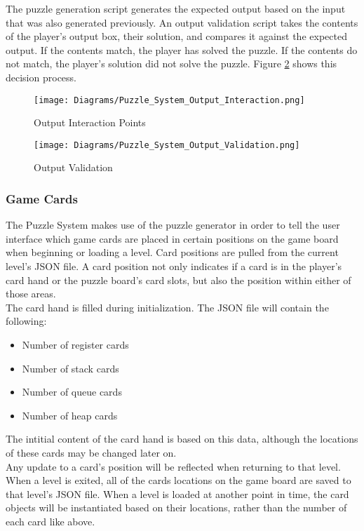 The puzzle generation script generates the expected output based on the input that
was also generated previously. An output validation script takes the contents of
the player's output box, their solution, and compares it against the expected output.
If the contents match, the player has solved the puzzle. If the contents do not match,
the player's solution did not solve the puzzle. Figure \ref{fig:Puzzle_System_Output_Validation} shows this decision process.

\begin{figure}[!hb]
  \caption{Output Interaction Points}
  \label{fig:Puzzle_System_Output_Interaction}
  \centering
  \texttt{[image: Diagrams/Puzzle\_System\_Output\_Interaction.png]}
\end{figure}

\begin{figure}[!hb]
  \caption{Output Validation}
  \label{fig:Puzzle_System_Output_Validation}
  \centering
  \texttt{[image: Diagrams/Puzzle\_System\_Output\_Validation.png]}
\end{figure}
\vfill
\clearpage

\subsubsection{Game Cards}
The Puzzle System makes use of the puzzle generator in order to tell the user interface
which game cards are placed in certain positions on the game board when beginning
or loading a level. Card positions are pulled from the current level's JSON file.
A card position not only indicates if a card is in the player's card hand or the puzzle board's
card slots, but also the position within either of those areas.\\

The card hand is filled during initialization. The JSON file will contain the following:
\begin{itemize}
   \item Number of register cards
   \item Number of stack cards
   \item Number of queue cards
   \item Number of heap cards
\end{itemize}

The intitial content of the card hand is based on this data, although the locations
of these cards may be changed later on.\\

Any update to a card's position will be reflected when returning to that level.
When a level is exited, all of the cards locations on the game board are saved to
that level's JSON file. When a level is loaded at another point in time, the card
objects will be instantiated based on their locations, rather than the number of
each card like above.\\

